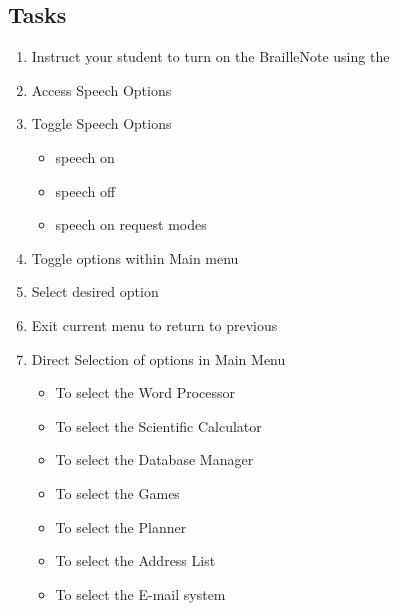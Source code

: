 \documentclass[10pt,letterpaper,twoside]{report}
\begin{document}
{{{\subsection{Tasks}
\begin{enumerate}
	\item Instruct your student to turn on the BrailleNote using the 
	\item Access Speech Options 
		\item Toggle Speech Options 
	    \begin{itemize}
	      \item speech on
	     \item speech off
	     \item speech on request modes
	    \end{itemize} 
	\item Toggle options within Main menu  
	\item Select desired option  
	\item Exit current menu to return to previous  
	\item Direct Selection of options in Main Menu
	    \begin{itemize}
	        \item To select the Word Processor 
	        \item To select the Scientific Calculator 
	        \item To select the Database Manager 
	        \item To select the Games 
	        \item To select the Planner 
	        \item To select the Address List 
	        \item To select the E-mail system 

\end{itemize}
\end{enumerate}}}}
\end{document}
